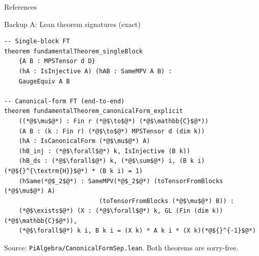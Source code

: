 \documentclass[aspectratio=169,10pt]{beamer}
\begin{document}

\begin{frame}[allowframebreaks]{References}
    
\end{frame}


\begin{frame}[fragile]{Backup A: Lean theorem signatures (exact)}
    \vspace{-0.6em}

    \begin{lstlisting}
-- Single-block FT
theorem fundamentalTheorem_singleBlock
    {A B : MPSTensor d D}
    (hA : IsInjective A) (hAB : SameMPV A B) :
    GaugeEquiv A B

-- Canonical-form FT (end-to-end)
theorem fundamentalTheorem_canonicalForm_explicit
    ((*@$\mu$@*) : Fin r (*@$\to$@*) (*@$\mathbb{C}$@*))
    (A B : (k : Fin r) (*@$\to$@*) MPSTensor d (dim k))
    (hA : IsCanonicalForm (*@$\mu$@*) A)
    (hB_inj : (*@$\forall$@*) k, IsInjective (B k))
    (hB_ds : (*@$\forall$@*) k, (*@$\sum$@*) i, (B k i)(*@${}^{\textrm{H}}$@*) * (B k i) = 1)
    (hSame(*@$_2$@*) : SameMPV(*@$_2$@*) (toTensorFromBlocks (*@$\mu$@*) A)
                          (toTensorFromBlocks (*@$\mu$@*) B)) :
    (*@$\exists$@*) (X : (*@$\forall$@*) k, GL (Fin (dim k)) (*@$\mathbb{C}$@*)),
    (*@$\forall$@*) k i, B k i = (X k) * A k i * (X k)(*@${}^{-1}$@*)
\end{lstlisting}

    \textcolor{dimwhite}{\footnotesize Source: \texttt{PiAlgebra/CanonicalFormSep.lean}. Both theorems are sorry-free.}
\end{frame}
\end{document}
